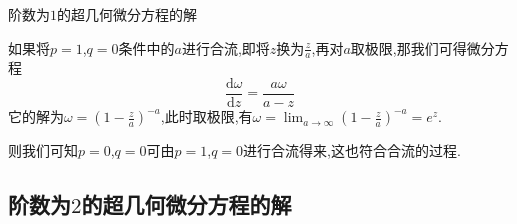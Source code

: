 \documentclass[zihao=-4,a4paper]{ctexart}
\begin{document}
\begin{mproof}{阶数为$1$的超几何微分方程的解}
\begin{enumerate}
		如果将$p=1$,$q=0$条件中的${a}$进行合流,即将${z}$换为$\frac{z}{a}$,再对${a}$取极限,那我们可得微分方程
		\begin{equation}
			\frac{ \text{d} {\omega} }{ \text{d} {z} } = \frac{ {a} {\omega} }{ {a} - {z} }
		\end{equation}
		它的解为$ {\omega} = { \left( 1 - \frac{z}{a} \right) }^{ -a } $,此时取极限,有$	{\omega} = \lim_{ {a} {\to} {\infty} } { \left( 1 - \frac{z}{a} \right) }^{ -a } = {e}^{z} $.

		则我们可知$p=0$,$q=0$可由$p=1$,$q=0$进行合流得来,这也符合合流的过程.
	\end{enumerate}
\end{mproof}

\subsection{阶数为$2$的超几何微分方程的解}
\end{document}
